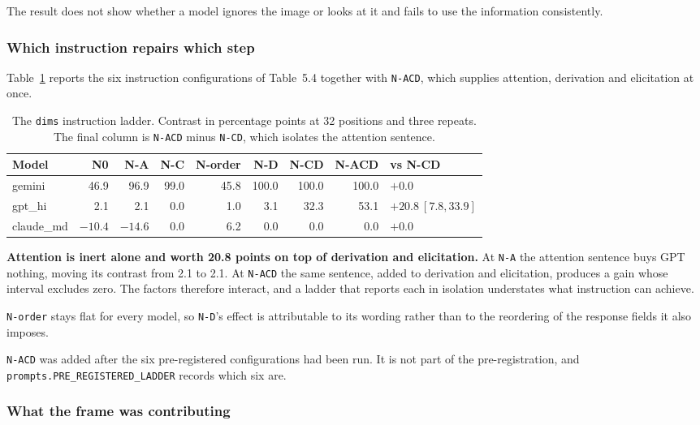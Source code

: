The result does not show whether a model ignores the image or looks at it and
fails to use the information consistently.

\subsubsection{Which instruction repairs which step}

Table~\ref{tab:ex2-ladder} reports the six instruction configurations of
Table~5.4 together with \texttt{N-ACD}, which supplies attention, derivation
and elicitation at once.

\begin{table}[h]
\caption{The \texttt{dims} instruction ladder. Contrast in percentage points at
32 positions and three repeats. The final column is \texttt{N-ACD} minus
\texttt{N-CD}, which isolates the attention sentence.}
\label{tab:ex2-ladder}
\centering
\begin{tabular}{lrrrrrrrl}
\toprule
Model & N0 & N-A & N-C & N-order & N-D & N-CD & N-ACD & vs N-CD \\
\midrule
gemini    &  46.9 &  96.9 &  99.0 &  45.8 & 100.0 & 100.0 & 100.0
  & $+0.0$ \\
gpt\_hi   &   2.1 &   2.1 &   0.0 &   1.0 &   3.1 &  32.3 &  53.1
  & $+20.8\ [7.8, 33.9]$ \\
claude\_md& $-10.4$ & $-14.6$ & 0.0 & 6.2 & 0.0 & 0.0 & 0.0
  & $+0.0$ \\
\bottomrule
\end{tabular}
\end{table}

\textbf{Attention is inert alone and worth 20.8 points on top of derivation and
elicitation.} At \texttt{N-A} the attention sentence buys GPT nothing, moving
its contrast from 2.1 to 2.1. At \texttt{N-ACD} the same sentence, added to
derivation and elicitation, produces a gain whose interval excludes zero. The
factors therefore interact, and a ladder that reports each in isolation
understates what instruction can achieve.

\texttt{N-order} stays flat for every model, so \texttt{N-D}'s effect is
attributable to its wording rather than to the reordering of the response
fields it also imposes.

\texttt{N-ACD} was added after the six pre-registered configurations had been
run. It is not part of the pre-registration, and
\texttt{prompts.PRE\_REGISTERED\_LADDER} records which six are.

\subsubsection{What the frame was contributing}
\label{sec:ex2-frame}

